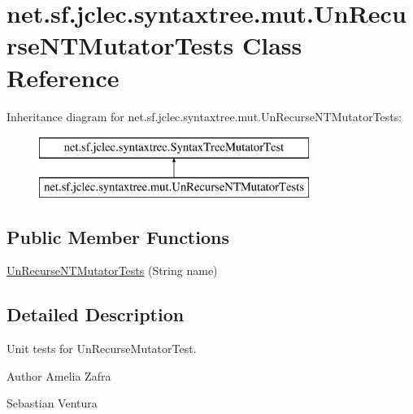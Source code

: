 \hypertarget{classnet_1_1sf_1_1jclec_1_1syntaxtree_1_1mut_1_1_un_recurse_n_t_mutator_tests}{\section{net.\-sf.\-jclec.\-syntaxtree.\-mut.\-Un\-Recurse\-N\-T\-Mutator\-Tests Class Reference}
\label{classnet_1_1sf_1_1jclec_1_1syntaxtree_1_1mut_1_1_un_recurse_n_t_mutator_tests}
}
Inheritance diagram for net.\-sf.\-jclec.\-syntaxtree.\-mut.\-Un\-Recurse\-N\-T\-Mutator\-Tests\-:\begin{figure}[H]
\begin{center}
\leavevmode
\includegraphics[height=2.000000cm]{classnet_1_1sf_1_1jclec_1_1syntaxtree_1_1mut_1_1_un_recurse_n_t_mutator_tests}
\end{center}
\end{figure}
\subsection*{Public Member Functions}
\begin{DoxyCompactItemize}
\item 
\hyperlink{classnet_1_1sf_1_1jclec_1_1syntaxtree_1_1mut_1_1_un_recurse_n_t_mutator_tests_aa01770056e03f38eccc519ce4b558aae}{Un\-Recurse\-N\-T\-Mutator\-Tests} (String name)
\end{DoxyCompactItemize}


\subsection{Detailed Description}
Unit tests for Un\-Recurse\-Mutator\-Test.

\begin{DoxyAuthor}{Author}
Amelia Zafra 

Sebastian Ventura 
\end{DoxyAuthor}


